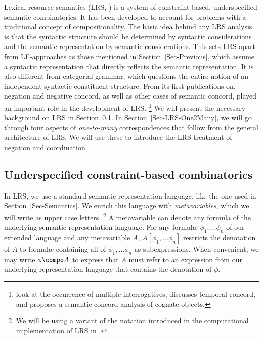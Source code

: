 \documentclass[output=paper]{langsci/langscibook}
\begin{document}
Lexical resource semantics (LRS, \citealt{Richter:Sailer:04}) is a system of constraint-based, underspecified semantic combinatorics.
It has been developed to account for problems with a traditional concept of compositionality. 
The basic idea behind any LRS analysis is that the syntactic structure should be determined by syntactic considerations and the semantic representation by semantic considerations. 
This sets LRS apart from LF-approaches as those mentioned in Section~\ref{Sec-Previous}, which assume a syntactic representation that directly reflects the semantic representation. It is also different from categorial grammar, which questions the entire notion of an independent syntactic constituent structure.
From its first publications on, negation and negative concord, as well as other cases of semantic concord, played an important role in the development of LRS.%
\footnote{\citet{Richter:Sailer:01.1} look at the occurrence of multiple interrogatives, 
\citet{Sailer:04.sub} discusses temporal concord, and \citet{Sailer:10} proposes a semantic concord-analysis of cognate objects.
}
We will present the necessary background on LRS in Section~\ref{Sec-LRS-Basics}. 
In Section~\ref{Sec-LRS-One2Many}, we will go through four aspects of \emph{one-to-many} correspondences that follow from the general architecture of LRS. We will use these to introduce the LRS treatment of negation and coordination. 

\subsection{Underspecified constraint-based combinatorics}
\label{Sec-LRS-Basics}

In LRS, we use a standard semantic representation language, like the one used in Section~\ref{Sec-Semantics}. 
We enrich this language with \emph{metavariables}, which we will write as upper case letters.%
\footnote{We will be using a variant of the notation introduced in the computational implementation of LRS in \citet{Penn:Richter:04,Penn:Richter:05}.}
A metavariable can denote any formula of the underlying semantic representation language.
For any formulæ $\phi_1, \ldots \phi_n$ of our extended language and any metavariable $A$, $A[\phi_1, \ldots \phi_n]$ restricts the denotation of $A$ to formulæ containing all of $\phi_1, \ldots \phi_n$ as subexpressions. 
When convenient, we may write $\phi \compo A$ to express that $A$ must refer to an expression from our underlying representation language that contains the denotation of $\phi$.
\end{document}
